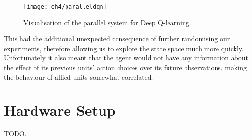 \begin{figure}[h]
    \centering
    \texttt{[image: ch4/paralleldqn]}
    \caption{Visualisation of the parallel system for Deep Q-learning.}
    \label{fig:paralleldqn}
\end{figure}

This had the additional unexpected consequence of further randomising our
experiments, therefore allowing us to explore the state space much more quickly.
Unfortunately it also meant that the agent would not have any information about
the effect of its previous units' action choices over its future observations,
making the behaviour of allied units somewhat correlated.


\section{Hardware Setup}

TODO.
